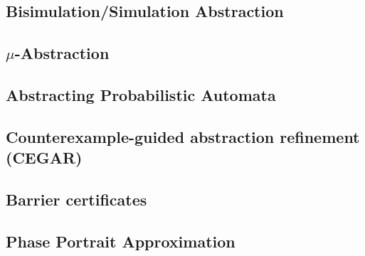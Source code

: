 \subsection{Bisimulation/Simulation Abstraction}
\label{sec:bisimsim}



\subsection{$\mu$-Abstraction}
\label{sec:mu}





\subsection{Abstracting Probabilistic Automata}
\label{sec:prob}



\subsection{Counterexample-guided abstraction refinement (CEGAR)}
\label{sec:cegar}




\subsection{Barrier certificates}
\label{sec:barrier}


\subsection{Phase Portrait Approximation}
\label{sec:phase}


